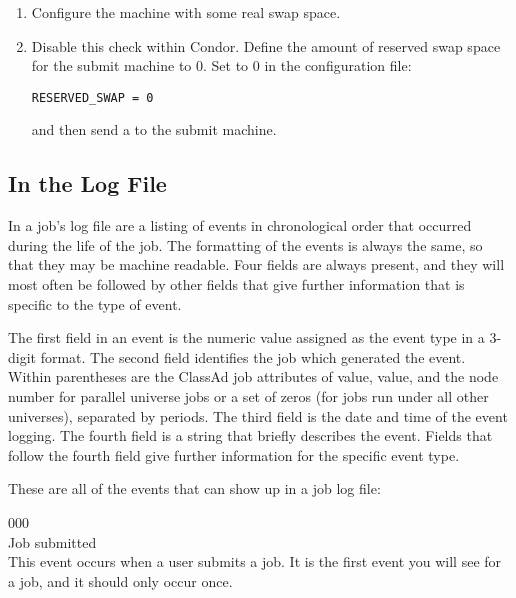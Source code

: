 \begin{enumerate}
\item Configure the machine with some real swap space.

\item Disable this check within Condor.
Define the amount of reserved swap space for the submit machine to 0.
Set  to 0 in the configuration file:

\begin{verbatim}
RESERVED_SWAP = 0
\end{verbatim}

and then send a  to the submit machine.
\end{enumerate}



\subsection{\label{sec:job-log-events}In the Log File}
In a job's log file are a listing of events in
chronological order that occurred during the life of the job.
The formatting of the events is always the same, 
so that they may be machine readable.
Four fields are always present,
and they will most often be followed by other fields that give further
information that is specific to the type of event.

The first field in an event is the numeric value assigned as the
event type in a 3-digit format.
The second field identifies the job which generated the event. 
Within parentheses are the ClassAd job attributes of
 value, 
 value, 
and the node number  for parallel universe jobs or a set of zeros
(for jobs run under all other universes),
separated by periods.
The third field is the date and time of the event logging.  
The fourth field is a string that briefly describes the event.
Fields that follow the fourth field give further information for the specific
event type.

These are all of the events that can show up in a job log file:

\noindent{} 000 \\
 Job submitted \\
 This event occurs when a user submits a job.
It is the first event you will see for a job, and it should only occur
once. 

